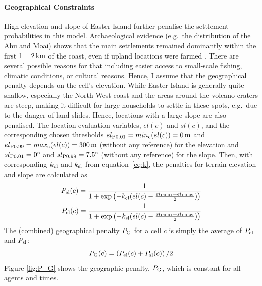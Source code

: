 \paragraph{Geographical Constraints}%
High elevation and slope of Easter Island further penalise the settlement probabilities in this model.
Archaeological evidence (e.g.\ the distribution of the Ahu and Moai) shows that the main settlements remained dominantly within the first $1-2\, \rm{km}$ of the coast, even if upland locations were farmed \citep{Bahn2017}.
There are several possible reasons for that including easier access to small-scale fishing, climatic conditions, or cultural reasons.
Hence, I assume that the geographical penalty depends on the cell's elevation.
While Easter Island is generally quite shallow, especially the North West coast and the areas around the volcano craters are steep, making it difficult for large households to settle in these spots, e.g.\ due to the danger of land slides. 
Hence, locations with a large slope are also penalised.
The location evaluation variables, $el(c)$ and $sl(c)$, and the corresponding chosen thresholds $el_{\rm P0.01}=min_{\rm c}(el(c))=0\, {\rm m}$ and $el_{\rm P0.99}=max_{\rm c}(el(c)) = 300\, {\rm m}$ (without any reference) for the elevation and $sl_{\rm P0.01}=0^\circ$ and $sl_{\rm P0.99}=7.5^\circ$ (without any reference) for the slope. 
Then, with corresponding $k_{\rm el}$ and $k_{\rm sl}$ from equation~\ref{eq:k}, the penalties for terrain elevation and slope are calculated as 
\begin{eqnarray}
	P_{\text{el}}(c) = \frac{1}{1+\exp\left( - k_{\rm el} (el(c)-\frac{el_{\rm P0.01}+el_{\rm P0.99}}{2}) \right)}\\
	P_{\text{sl}}(c) = \frac{1}{1+\exp\left( - k_{\rm sl} (sl(c)-\frac{sl_{\rm P0.01}+sl_{\rm P0.99}}{2}) \right)}
\end{eqnarray}
The (combined) geographical penalty $P_{\rm G}$ for a cell $c$ is simply the average of $P_{\rm el}$ and $P_{\rm sl}$:
\begin{equation}
P_{\rm G}(c) = \left(P_\text{el}(c)+P_\text{sl}(c) \right)/2
\end{equation}
Figure \ref{fig:P_G} shows the geographic penalty, $P_{\rm G}$, which is constant for all agents and times.
